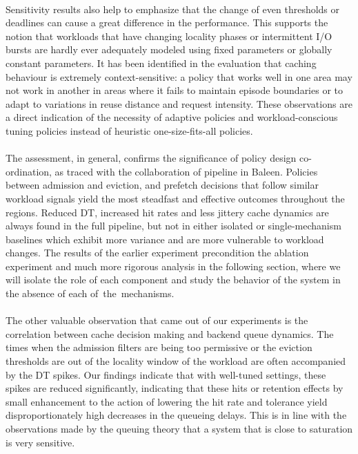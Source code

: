 \documentclass[sigconf]{acmart}
\begin{document}
{\\Sensitivity results also help to emphasize that the change of even thresholds or deadlines can cause a great difference in the performance. This supports the notion that workloads that have changing locality phases or intermittent I/O bursts are hardly ever adequately modeled using fixed parameters or globally constant parameters. It has been identified in the evaluation that caching behaviour is extremely context-sensitive: a policy that works well in one area may not work in another in areas where it fails to maintain episode boundaries or to adapt to variations in reuse distance and request intensity. These observations are a direct indication of the necessity of adaptive policies and workload-conscious tuning policies instead of heuristic one-size-fits-all policies.\\
\\The assessment, in general, confirms the significance of policy design co-ordination, as traced with the collaboration of pipeline in Baleen. Policies between admission and eviction, and prefetch decisions that follow similar workload signals yield the most steadfast and effective outcomes throughout the regions. Reduced DT, increased hit rates and less jittery cache dynamics are always found in the full pipeline, but not in either isolated or single-mechanism baselines which exhibit more variance and are more vulnerable to workload changes. The results of the earlier experiment precondition the ablation experiment and much more rigorous analysis in the following section, where we will isolate the role of each component and study the behavior of the system in the absence of each of the mechanisms.\\
\\The other valuable observation that came out of our experiments is the correlation between cache decision making and backend queue dynamics. The times when the admission filters are being too permissive or the eviction thresholds are out of the locality window of the workload are often accompanied by the DT spikes. Our findings indicate that with well-tuned settings, these spikes are reduced significantly, indicating that these hits or retention effects by small enhancement to the action of lowering the hit rate and tolerance yield disproportionately high decreases in the queueing delays. This is in line with the observations made by the queuing theory that a system that is close to saturation is very sensitive.\\
}
\end{document}
